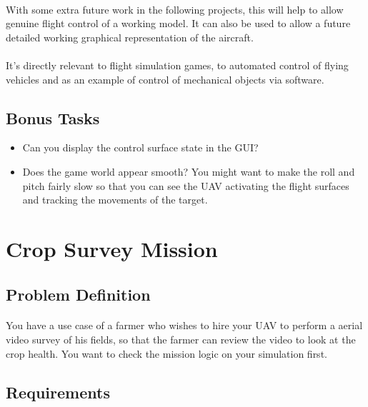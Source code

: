 \documentclass[11pt]{book}
\begin{document}
\paragraph{} With some extra future work in the following projects, this will
help to allow genuine flight control of a working model. It can also be used
to allow a future detailed working graphical representation of the aircraft.

\paragraph{} It's directly relevant to flight simulation games, to automated
control of flying vehicles and as an example of control of mechanical objects
via software.

\subsection{Bonus Tasks}

\begin{itemize}
\item Can you display the control surface state in the GUI?
\item Does the game world appear smooth? You might want to make the roll and pitch fairly slow so that you can see the UAV activating the flight surfaces and tracking the movements of the target.
\end{itemize}

\clearpage

\section{Crop Survey Mission}

\subsection{Problem Definition}

\paragraph{} You have a use case of a farmer who wishes to hire your UAV to
perform a aerial video survey of his fields, so that the farmer can review the
video to look at the crop health. You want to check the mission logic on your
simulation first.

\subsection{Requirements}
\end{document}
